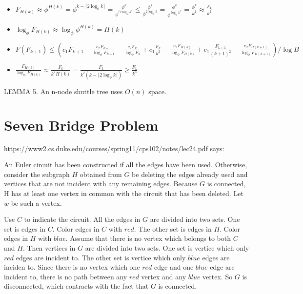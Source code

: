 \documentclass{book}
\begin{document}
\begin{itemize}
\item $F_{H(k)} \approx \phi^{H(k)} = \phi^{k-\lceil2\log_{\phi}k\rceil}=\frac{\phi^k}{\phi^{\lceil2\log_{\phi}k\rceil}} \leq \frac{\phi^k}{\phi^{2\log_{\phi}k}} = \frac{\phi^k}{\phi^{\log_{\phi}k^2}}=\frac{\phi^{k}}{k^2}\approx \frac{F_k}{k^2}$

\item $\log_{\phi}F_{H(k)} \approx \log_{\phi}\phi^{H(k)} = H(k)$

\item $F(F_{k+1}) \leq (c_1F_{k+1}-\frac{c_2F_{k-1}}{\log_{\phi}F_{k-1}} -\frac{c_2F_k}{\log_{\phi}F_k} + c_1\frac{F_k}{k^2}-\frac{c_2F_{H(k)}}{\log_{\phi}F_{H(k)}}+ c_1\frac{F_{k+1}}{(k+1)^2}-\frac{c_2F_{H(k+1)}}{\log_{\phi}F_{H(k+1)}})/\log B$

\item $\frac{F_{H(k)}}{\log_{\phi}F_{H(k)}}\approx\frac{F_k}{k^2H(k)}=\frac{F_k}{k^2(k-\lceil2\log_{\phi}k\rceil)} \geq \frac{F_k}{k^3}$

\end{itemize}

LEMMA 5. An n-node shuttle tree uses $O(n)$ space.

\chapter{Seven Bridge Problem}

https://www2.cs.duke.edu/courses/spring11/cps102/notes/lec24.pdf says:

\begin{displayquote}
An Euler circuit has been constructed if all the edges have been used.
Otherwise, consider the subgraph $H$ obtained from $G$ be deleting the edges
already used and vertices that are not incident with any remaining edges.
Because $G$ is connected, H has at least one vertex in common with the
circuit that has been deleted. Let $w$ be such a vertex.
\end{displayquote}

Use $C$ to indicate the circuit. All the edges in $G$ are divided into two sets.
One set is edges in $C$. Color edges in $C$ with $red$. The other set is edges in
$H$. Color edges in $H$ with $blue$.  Assume that there is no vertex which belongs
to both $C$ and $H$. Then vertices in $G$ are divided into two sets. One set is
vertice which only $red$ edges are incident to. The other set is vertice which
only $blue$ edges are inciden to. Since there is no vertex which one $red$ edge
and one $blue$ edge are incident to, there is no path between any $red$ vertex and
any $blue$ vertex. So $G$ is disconnected, which contracts with the fact that $G$
is connected.
\end{document}
